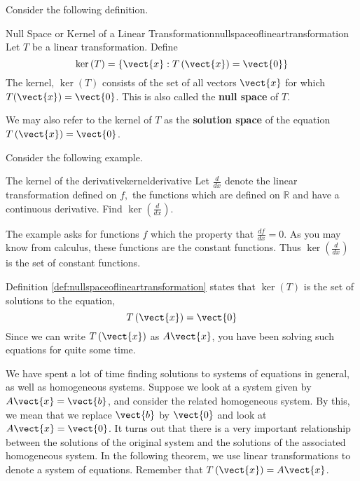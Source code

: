 Consider the following definition.

\begin{definition}{Null Space or Kernel of a Linear Transformation}{nullspaceoflineartransformation}
Let $T$ be a linear transformation. Define
\begin{equation*}
\ker \left( T\right) = \left\{ \vect{x}:T \left(\vect{x} \right)= \vect{0} \right\} 
\end{equation*}
The kernel, $\ker \left( T\right) $ consists of the set of all vectors $\vect{x}$ for which
$T (\vect{x}) = \vect{0}$. This is also called the
\textbf{null space} of $T$. 
\end{definition}

We may also refer to the kernel of $T$ as the
\textbf{solution space} of the equation $T \left(\vect{x}\right) = \vect{0}$.


Consider the following example.

\begin{example}{The kernel of the derivative}{kernelderivative}
Let $\frac{d}{dx}$ denote the linear transformation defined on $f,$ the functions
which are defined on $\mathbb{R}$ and have a continuous derivative. Find 
$\ker \left( \frac{d}{dx}\right) .$
\end{example}

\begin{solution} The example asks for functions $f$ which the property that $\frac{df}{dx}
=0. $ As you may know from calculus, these functions are the constant functions.
Thus $\ker \left( \frac{d}{dx}\right)$ is the set of constant functions.
\end{solution} 

Definition \ref{def:nullspaceoflineartransformation} states that $\ker \left( T\right) $ is the set of
solutions to the equation,
\begin{equation*}
T\left( \vect{x} \right) = \vect{0}
\end{equation*}
Since we can write $T\left( \vect{x} \right)$ as $A\vect{x}$, you have been solving such
equations for quite some time.

We have spent a lot of time finding solutions to systems of equations in general, as well as
homogeneous systems. Suppose we look at a system given by $A\vect{x}=\vect{b}$, and consider the 
related homogeneous system. By this, we mean that we replace $\vect{b}$ by $\vect{0}$ and look at $A\vect{x}=\vect{0}$. 
It turns out that there is a very important relationship between the solutions of the original
system and the solutions of the associated homogeneous system. In the following 
theorem, we use linear transformations to denote a system of equations. Remember that
$T\left(\vect{x}\right) = A\vect{x}$.

